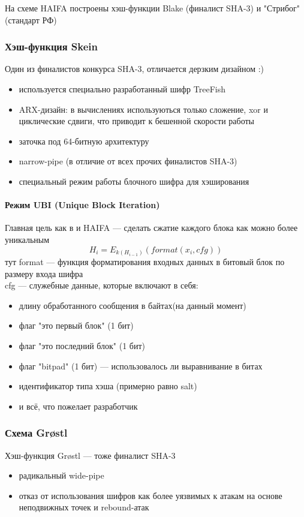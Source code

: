 На схеме HAIFA построены хэш-функции Blake (финалист SHA-3) и "Стрибог"
(стандарт РФ)

\subsubsection{Хэш-функция Skein}
Один из финалистов конкурса SHA-3, отличается дерзким дизайном :)
\begin{itemize}
  \item используется специально разработанный шифр TreeFish
  \item ARX-дизайн: в вычислениях используються только сложение, xor и
  циклические сдвиги, что приводит к бешенной скорости работы
  \item заточка под 64-битную архитектуру
  \item narrow-pipe (в отличие от всех прочих финалистов SHA-3)
  \item специальный режим работы блочного шифра для хэширования
\end{itemize}

\paragraph{Режим UBI (Unique Block Iteration)}

Главная цель как в и HAIFA --- сделать сжатие каждого блока как можно 
более уникальным
\[H_{i} = E_{k(H_{i-1})}(format(x_{i}, cfg))\]
тут format --- функция форматирования входных данных в битовый блок по размеру входа шифра\\
cfg --- служебные данные, которые включают в себя:
\begin{itemize}
  \item длину обработанного сообщения в байтах(на данный момент)
  \item флаг "это первый блок" (1 бит)
  \item флаг "это последний блок" (1 бит)
  \item флаг "bitpad" (1 бит) --- использовалось ли выравнивание в битах
  \item идентификатор типа хэша (примерно равно salt)
  \item и всё, что пожелает разработчик
\end{itemize}

\subsubsection{Схема Gr{\o}stl}
Хэш-функция Gr{\o}stl --- тоже финалист SHA-3
\begin{itemize}
  \item радикальный wide-pipe
  \item отказ от использования шифров как более уязвимых к атакам на основе неподвижных точек и rebound-атак
\end{itemize}

